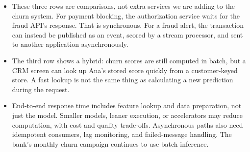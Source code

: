 \documentclass[11pt,a4paper]{article}
\begin{document}
\begin{examplebox}[title after break={SPOKEN SCRIPT --- slide 10 continued}]
\begin{itemize}
\item These three rows are comparisons, not extra services we are adding to the churn system. For payment blocking, the authorization service waits for the fraud API's response. That is synchronous. For a fraud alert, the transaction can instead be published as an event, scored by a stream processor, and sent to another application asynchronously.
\item The third row shows a hybrid: churn scores are still computed in batch, but a CRM screen can look up Ana's stored score quickly from a customer-keyed store. A fast lookup is not the same thing as calculating a new prediction during the request.
\item End-to-end response time includes feature lookup and data preparation, not just the model. Smaller models, leaner execution, or accelerators may reduce computation, with cost and quality trade-offs. Asynchronous paths also need idempotent consumers, lag monitoring, and failed-message handling. The bank's monthly churn campaign continues to use batch inference.
\end{itemize}
\end{examplebox}
\par\noindent{\scriptsize\textcolor{teal!60!black}{Reading anchor: Kalinowski, §13.3–13.4, Fig. 13.3–13.4 · Fraud and CRM cases are teaching comparisons}}
\clearpage
\end{document}
